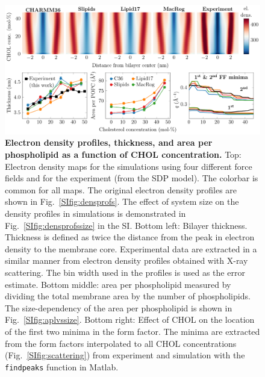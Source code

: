 \documentclass[journal=jctcce]{achemso}
\begin{document}
\begin{figure}[htb!]
  \centering
  \includegraphics[width=\linewidth]{../FIGS/densitymaps.pdf}
  \caption{\label{fig:densmaps}%
  \textbf{Electron density profiles, thickness, and area per phospholipid as a function of CHOL concentration.}
  Top: Electron density maps for the simulations using four different force fields and for the experiment (from the SDP model). The colorbar is common for all maps. The original electron density profiles are shown in Fig.~\ref{SIfig:densprofs}. The effect of system size on the density profiles in simulations is demonstrated in Fig.~\ref{SIfig:densprofssize} in the SI.
  Bottom left: Bilayer thickness. Thickness is defined as twice the distance from the peak in electron density to the membrane core. Experimental data are extracted in a similar manner from electron density profiles obtained with X-ray scattering. The bin width used in the profiles is used as the error estimate.
  Bottom middle: area per phospholipid measured by dividing the total membrane area by the number of phospholipids. The size-dependency of the area per phospholipid is shown in Fig.~\ref{SIfig:aplvssize}.
  Bottom right: Effect of CHOL on the location of the first two minima in the form factor. The minima are extracted from the form factors interpolated to all CHOL concentrations (Fig.~\ref{SIfig:scattering}) from experiment and simulation with the \texttt{findpeaks} function in Matlab.
  }
\end{figure}
\end{document}
